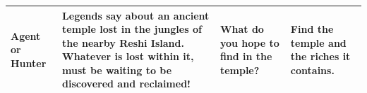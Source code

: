 \begin{table}
\begin{tabular}{p{2.8cm} p{6cm} p{3cm} p{3cm}}
	\color{black} Agent or Hunter
	&
	\color{black} Legends say about an ancient temple lost in the jungles of the nearby Reshi Island. Whatever is lost within it, must be waiting to be discovered and reclaimed! \newline
	&
	\color{black} What do you hope to find in the temple?
	&
	\color{black} Find the temple and the riches it contains.
	\\ \hline
	
\end{tabular}
\end{table}
\twocolumn